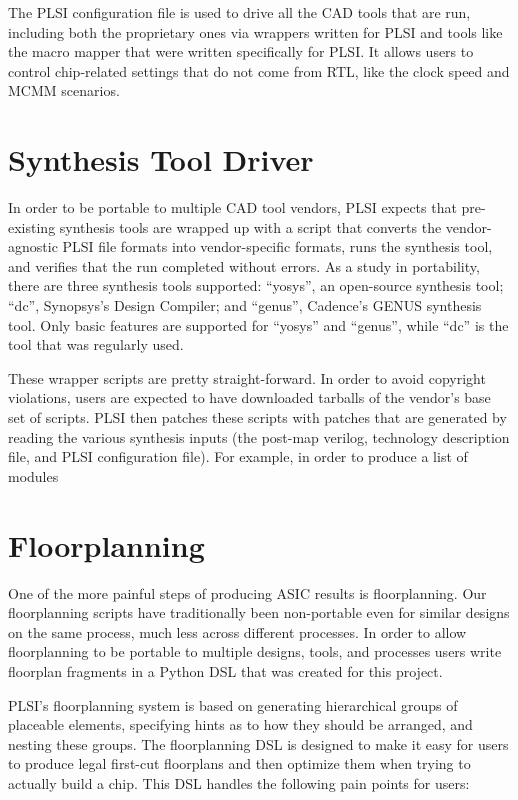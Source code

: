 \documentclass{article}
\begin{document}
The PLSI configuration file is used to drive all the CAD tools that are run,
including both the proprietary ones via wrappers written for PLSI and tools
like the macro mapper that were written specifically for PLSI.  It allows users
to control chip-related settings that do not come from RTL, like the clock
speed and MCMM scenarios.

\section{Synthesis Tool Driver}

In order to be portable to multiple CAD tool vendors, PLSI expects that
pre-existing synthesis tools are wrapped up with a script that converts the
vendor-agnostic PLSI file formats into vendor-specific formats, runs the
synthesis tool, and verifies that the run completed without errors.  As a study
in portability, there are three synthesis tools supported: ``yosys'', an
open-source synthesis tool; ``dc'', Synopsys's Design Compiler; and ``genus'',
Cadence's GENUS synthesis tool.  Only basic features are supported for ``yosys''
and ``genus'', while ``dc'' is the tool that was regularly used.

These wrapper scripts are pretty straight-forward.  In order to avoid copyright
violations, users are expected to have downloaded tarballs of the vendor's base
set of scripts.  PLSI then patches these scripts with patches that are
generated by reading the various synthesis inputs (the post-map verilog,
technology description file, and PLSI configuration file).  For example, in
order to produce a list of modules

\section{Floorplanning}

One of the more painful steps of producing ASIC results is floorplanning.  Our
floorplanning scripts have traditionally been non-portable even for similar
designs on the same process, much less across different processes.  In order to
allow floorplanning to be portable to multiple designs, tools, and processes
users write floorplan fragments in a Python DSL that was created for this
project.

PLSI's floorplanning system is based on generating hierarchical groups of
placeable elements, specifying hints as to how they should be arranged, and
nesting these groups.  The floorplanning DSL is designed to make it easy for
users to produce legal first-cut floorplans and then optimize them when trying
to actually build a chip.  This DSL handles the following pain points for users:
\end{document}

